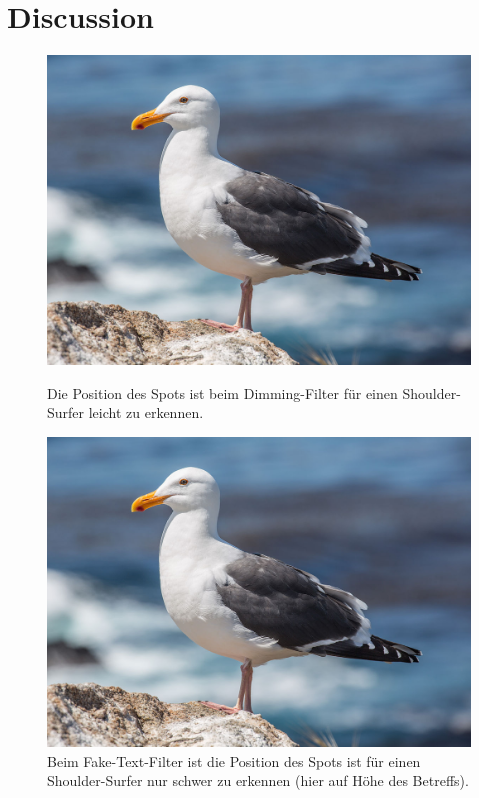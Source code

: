 \cleardoublepage

\section{Discussion}
\label{sec:discussion}

\blindtext

\begin{figure}[hbt]
  \includegraphics[width=\linewidth]{figures/gull}
  \caption{Die Position des Spots ist beim Dimming-Filter für einen Shoulder-Surfer leicht zu erkennen.}
  \label{fig:shoulderVideoDimming}
\endminipage\hfill
{}
  \includegraphics[width=\linewidth]{figures/gull}
  \caption{Beim Fake-Text-Filter ist die Position des Spots ist für einen Shoulder-Surfer nur schwer zu erkennen (hier auf Höhe des Betreffs).}
  \label{fig:shoulderVideoFakeText}
  \endminipage
\end{figure}